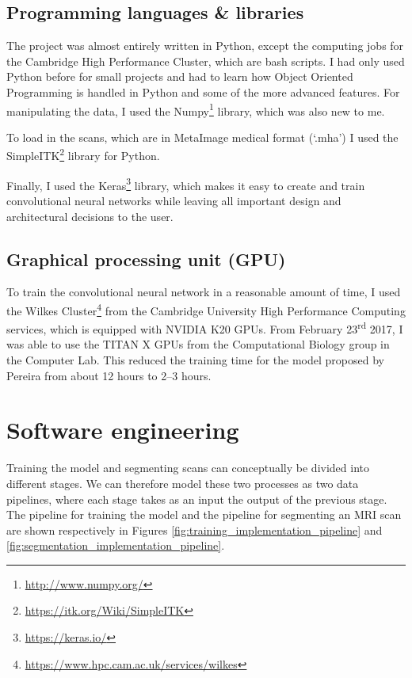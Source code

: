 \documentclass[12pt,a4paper,twoside,openright]{report}
\begin{document}
\subsection{Programming languages \& libraries}
The project was almost entirely written in Python, except the computing jobs for the Cambridge High Performance Cluster, which are bash scripts. I had only used Python before for small projects and had to learn how Object Oriented Programming is handled in Python and some of the more advanced features. For manipulating the data, I used the Numpy\footnote{\url{http://www.numpy.org/}} library, which was also new to me.

To load in the scans, which are in MetaImage medical format (`.mha') I used the SimpleITK\footnote{\url{https://itk.org/Wiki/SimpleITK}} library for Python.

Finally, I used the Keras\footnote{\url{https://keras.io/}} library, which makes it easy to create and train convolutional neural networks while leaving all important design and architectural decisions to the user. 

\subsection{Graphical processing unit (GPU)}
To train the convolutional neural network in a reasonable amount of time, I used the Wilkes Cluster\footnote{\url{https://www.hpc.cam.ac.uk/services/wilkes}} from the Cambridge University High Performance Computing services, which is equipped with NVIDIA K20 GPUs. From February 23\textsuperscript{rd} 2017, I was able to use the TITAN X GPUs from the Computational Biology group in the Computer Lab. This reduced the training time for the model proposed by Pereira from about 12 hours to 2--3 hours.

\section{Software engineering}
Training the model and segmenting scans can conceptually be divided into different stages. We can therefore model these two processes as two data pipelines, where each stage takes as an input the output of the previous stage. The pipeline for training the model and the pipeline for segmenting an MRI scan are shown respectively in Figures \ref{fig:training_implementation_pipeline} and \ref{fig:segmentation_implementation_pipeline}.
\end{document}
